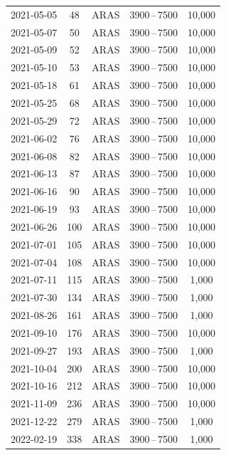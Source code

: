 \documentclass[11pt]{article}
\begin{document}
\begin{table}[htbp]
{\begin{tabular}{lcccc}
2021-05-05 &  48  & ARAS & 3900\,--\,7500 & 10,000 \\
2021-05-07 &  50  & ARAS & 3900\,--\,7500 & 10,000 \\
2021-05-09 &  52  & ARAS & 3900\,--\,7500 & 10,000 \\
2021-05-10 &  53  & ARAS & 3900\,--\,7500 & 10,000 \\
2021-05-18 &  61  & ARAS & 3900\,--\,7500 & 10,000 \\
2021-05-25 &  68  & ARAS & 3900\,--\,7500 & 10,000 \\
2021-05-29 &  72  & ARAS & 3900\,--\,7500 & 10,000 \\
2021-06-02 &  76  & ARAS & 3900\,--\,7500 & 10,000 \\
2021-06-08 &  82  & ARAS & 3900\,--\,7500 & 10,000 \\
2021-06-13 &  87  & ARAS & 3900\,--\,7500 & 10,000 \\
2021-06-16 &  90  & ARAS & 3900\,--\,7500 & 10,000 \\
2021-06-19 &  93  & ARAS & 3900\,--\,7500 & 10,000 \\
2021-06-26 & 100  & ARAS & 3900\,--\,7500 & 10,000 \\
2021-07-01 & 105  & ARAS & 3900\,--\,7500 & 10,000 \\
2021-07-04 & 108  & ARAS & 3900\,--\,7500 & 10,000 \\
2021-07-11 & 115  & ARAS & 3900\,--\,7500 & 1,000  \\
2021-07-30 & 134  & ARAS & 3900\,--\,7500 & 1,000  \\
2021-08-26 & 161  & ARAS & 3900\,--\,7500 & 1,000  \\
2021-09-10 & 176  & ARAS & 3900\,--\,7500 & 10,000 \\
2021-09-27 & 193  & ARAS & 3900\,--\,7500 & 1,000  \\
2021-10-04 & 200  & ARAS & 3900\,--\,7500 & 10,000 \\
2021-10-16 & 212  & ARAS & 3900\,--\,7500 & 10,000 \\
2021-11-09 & 236  & ARAS & 3900\,--\,7500 & 10,000 \\
2021-12-22 & 279  & ARAS & 3900\,--\,7500 & 1,000  \\
2022-02-19 & 338  & ARAS & 3900\,--\,7500 & 1,000  \\
\hline
\end{tabular}
}
\end{table}
\end{document}
